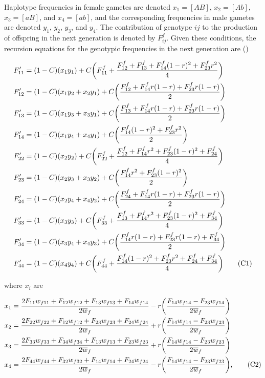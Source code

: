 \documentclass{article}
\newcommand\numberthis{\addtocounter{equation}{1}\tag{\theequation}}
\begin{document}
Haplotype frequencies in female gametes are denoted $x_1 = [AB]$, $x_2 = [Ab]$, $x_3 = [aB]$, and $x_4 = [ab]$, and the corresponding frequencies in male gametes are denoted $y_1$, $y_2$, $y_3$, and $y_4$. The contribution of genotype $ij$ to the production of offspring in the next generation is denoted by $F^f_{ij}$. Given these conditions, the recursion equations for the genotypic frequencies in the next generation are (\citealt{Holden1979, JordanConn2014})

\begin{align*} \label{eq:genRec}
	F'_{11} &= (1 - C) (x_1 y_1)           + C \bigg( F^f_{11} + \frac{F^f_{12} + F^f_{13} + F^f_{14}(1 - r)^2 + F^f_{23} r^2}{4} \bigg)  \\
	F'_{12} &= (1 - C) (x_1 y_2 + x_2 y_1) + C \bigg( \frac{F^f_{12} + F^f_{14} r(1-r) + F^f_{23} r(1-r)}{2} \bigg)  \\
	F'_{13} &= (1 - C) (x_1 y_3 + x_3 y_1) + C \bigg( \frac{F^f_{13} + F^f_{14} r(1-r) + F^f_{23} r(1-r)}{2} \bigg)  \\
	F'_{14} &= (1 - C) (x_1 y_4 + x_4 y_1) + C \bigg( \frac{F^f_{14} (1-r)^2 + F^f_{23} r^2}{2} \bigg)  \\
	F'_{22} &= (1 - C) (x_2 y_2)           + C \bigg( F^f_{22} + \frac{F^f_{12} + F^f_{14} r^2 + F^f_{23} (1-r)^2 + F^f_{24}}{4} \bigg)  \\
	F'_{23} &= (1 - C) (x_2 y_3 + x_3 y_2) + C \bigg( \frac{F^f_{14} r^2 + F^f_{23} (1-r)^2}{2} \bigg)  \\
	F'_{24} &= (1 - C) (x_2 y_4 + x_4 y_2) + C \bigg( \frac{F^f_{24} + F^f_{14} r(1-r) + F^f_{23} r(1-r)}{2} \bigg)  \\
	F'_{33} &= (1 - C) (x_3 y_3)           + C \bigg( F^f_{33} + \frac{F^f_{13} + F^f_{14} r^2 + F^f_{23} (1-r)^2 + F^f_{34}}{4} \bigg)  \\
	F'_{34} &= (1 - C) (x_3 y_4 + x_4 y_3) + C \bigg( \frac{F^f_{14} r(1-r) + F^f_{23} r(1-r) + F^f_{34}}{2} \bigg)  \\
	F'_{44} &= (1 - C) (x_4 y_4)           + C \bigg( F^f_{44} + \frac{F^f_{14} (1-r)^2 + F^f_{23} r^2 + F^f_{24} + F^f_{34}}{4} \bigg)  \numberthis
\end{align*}

\noindent{} where $x_{i}$ are

\begin{align*}
	x_1 &= \frac{2 F_{11} w_{f11} + F_{12} w_{f12} + F_{13} w_{f13} + F_{14} w_{f14}}{2 \overline{w}_f} - r \bigg( \frac{F_{14} w_{f14} - F_{23} w_{f14}}{2 \overline{w}_f} \bigg) \\
	x_2 &= \frac{2 F_{22} w_{f22} + F_{12} w_{f12} + F_{23} w_{f23} + F_{24} w_{f24}}{2 \overline{w}_f} + r \bigg( \frac{F_{14} w_{f14} - F_{23} w_{f23}}{2 \overline{w}_f} \bigg) \\
	x_3 &= \frac{2 F_{33} w_{f33} + F_{34} w_{f34} + F_{13} w_{f13} + F_{23} w_{f23}}{2 \overline{w}_f} + r \bigg( \frac{F_{14} w_{f14} - F_{23} w_{f23}}{2 \overline{w}_f} \bigg) \\
	x_4 &= \frac{2 F_{44} w_{f44} + F_{32} w_{f32} + F_{14} w_{f14} + F_{24} w_{f24}}{2 \overline{w}_f} - r \bigg( \frac{F_{14} w_{f14} - F_{23} w_{f23}}{2 \overline{w}_f} \bigg), \numberthis
\end{align*}
\end{document}
